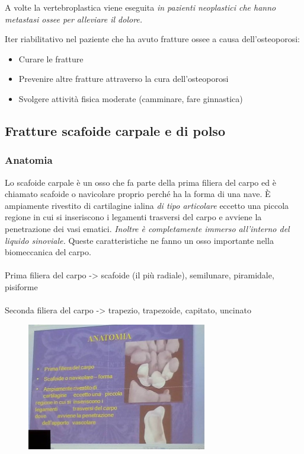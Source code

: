 A volte la vertebroplastica viene eseguita \emph{in pazienti neoplastici che hanno metastasi ossee per alleviare il dolore.}

Iter riabilitativo nel paziente che ha avuto fratture ossee a causa dell'osteoporosi:

\begin{itemize}
\item
  Curare le fratture
\item
  Prevenire altre fratture attraverso la cura dell'osteoporosi
\item
  Svolgere attività fisica moderate (camminare, fare ginnastica)
\end{itemize}

\subsection{Fratture scafoide carpale e di polso}

\subsubsection{Anatomia}

Lo scafoide carpale è un osso che fa parte della prima filiera del carpo ed è chiamato scafoide o navicolare proprio perché ha la forma di una nave. È ampiamente rivestito di cartilagine ialina \emph{\emph{di tipo
articolare}} eccetto una piccola regione in cui si inseriscono i legamenti trasversi del carpo e avviene la penetrazione dei vasi ematici. \emph{Inoltre è completamente immerso all'interno del liquido
sinoviale.} Queste caratteristiche ne fanno un osso importante nella biomeccanica del carpo.
\\\\
Prima filiera del carpo -> scafoide (il più radiale), semilunare, piramidale, pisiforme
\\\\
Seconda filiera del carpo -> trapezio, trapezoide, capitato, uncinato

\begin{figure}[!ht]
\centering
\includegraphics[width=0.7\textwidth]{003/image7.jpeg}
\end{figure}

